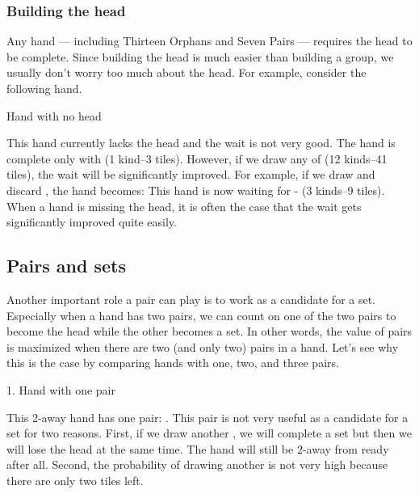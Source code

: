 \subsubsection{Building the head}
Any hand --- including Thirteen Orphans and Seven Pairs --- requires the head to be complete. Since building the head is much easier than building a group, we usually don't worry too much about the head. For example, consider the following hand. 
\bigskip
\begin{itembox}[r]{Hand with no head}
\bp
{}
\ep
\end{itembox}
This hand currently lacks the head and the wait is not very good. The hand is complete only with {\LARGE{}} (1 kind--3 tiles).
However, if we draw any of {\LARGE{}} (12 kinds--41 tiles), the wait will be significantly improved. 
For example, if we draw {\LARGE{}} and discard {\LARGE{}}, the hand becomes:
\bp
{}
\ep
This hand is now waiting for {\LARGE{} -} (3 kinds--9 tiles). 
When a hand is missing the head, it is often the case that the wait gets significantly improved quite easily. 

\subsection{Pairs and sets} \label{sec:2pairs}
Another important role a pair can play is to work as a candidate for a set. 
Especially when a hand has two pairs, we can count on one of the two pairs to become the head while the other becomes a set. In other words, the value of pairs is maximized when there are two (and only two) pairs in a hand. Let's see why this is the case by comparing hands with one, two, and three pairs. 

\begin{itembox}[r]{1. Hand with one pair}
\bp
{}\bei
\ep
\end{itembox}
\noindent
This 2-away hand has one pair: {\LARGE{}}. This pair is not very useful as a candidate for a set for two reasons. First, if we draw another {\LARGE{}}, we will complete a set but then we will lose the head at the same time. The hand will still be 2-away from ready after all. Second, the probability of drawing another {\LARGE{}} is not very high because there are only two tiles left. 

